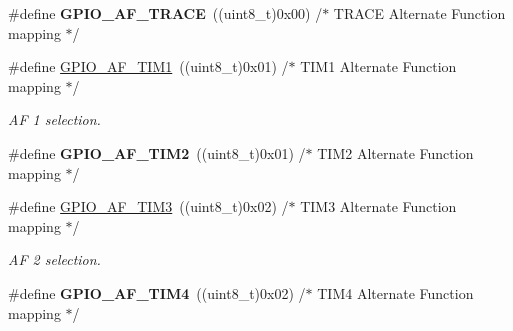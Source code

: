 \begin{DoxyCompactItemize}
\item 
\#define {\bfseries G\+P\+I\+O\+\_\+\+A\+F\+\_\+\+T\+R\+A\+CE}~((uint8\+\_\+t)0x00)  /$\ast$ T\+R\+A\+C\+E Alternate Function mapping $\ast$/\hypertarget{group___g_p_i_o___alternat__function__selection__define_gac97ace879d6584f8bd705fa1d199d4d4}{}\label{group___g_p_i_o___alternat__function__selection__define_gac97ace879d6584f8bd705fa1d199d4d4}

\item 
\#define \hyperlink{group___g_p_i_o___alternat__function__selection__define_ga9a65573a3d8684febe1fda5c6cd8c992}{G\+P\+I\+O\+\_\+\+A\+F\+\_\+\+T\+I\+M1}~((uint8\+\_\+t)0x01)  /$\ast$ T\+I\+M1 Alternate Function mapping $\ast$/\hypertarget{group___g_p_i_o___alternat__function__selection__define_ga9a65573a3d8684febe1fda5c6cd8c992}{}\label{group___g_p_i_o___alternat__function__selection__define_ga9a65573a3d8684febe1fda5c6cd8c992}

\begin{DoxyCompactList}\small\item\em AF 1 selection. \end{DoxyCompactList}\item 
\#define {\bfseries G\+P\+I\+O\+\_\+\+A\+F\+\_\+\+T\+I\+M2}~((uint8\+\_\+t)0x01)  /$\ast$ T\+I\+M2 Alternate Function mapping $\ast$/\hypertarget{group___g_p_i_o___alternat__function__selection__define_ga6a1335e47fe67ff5a08ebe0ebfec2ffa}{}\label{group___g_p_i_o___alternat__function__selection__define_ga6a1335e47fe67ff5a08ebe0ebfec2ffa}

\item 
\#define \hyperlink{group___g_p_i_o___alternat__function__selection__define_ga8c6bda0c56abc29eef7709b52d9d3e0d}{G\+P\+I\+O\+\_\+\+A\+F\+\_\+\+T\+I\+M3}~((uint8\+\_\+t)0x02)  /$\ast$ T\+I\+M3 Alternate Function mapping $\ast$/\hypertarget{group___g_p_i_o___alternat__function__selection__define_ga8c6bda0c56abc29eef7709b52d9d3e0d}{}\label{group___g_p_i_o___alternat__function__selection__define_ga8c6bda0c56abc29eef7709b52d9d3e0d}

\begin{DoxyCompactList}\small\item\em AF 2 selection. \end{DoxyCompactList}\item 
\#define {\bfseries G\+P\+I\+O\+\_\+\+A\+F\+\_\+\+T\+I\+M4}~((uint8\+\_\+t)0x02)  /$\ast$ T\+I\+M4 Alternate Function mapping $\ast$/\hypertarget{group___g_p_i_o___alternat__function__selection__define_gabe02d26327e89fe4c9aaf30ec1187009}{}\label{group___g_p_i_o___alternat__function__selection__define_gabe02d26327e89fe4c9aaf30ec1187009}


\end{DoxyCompactItemize}
